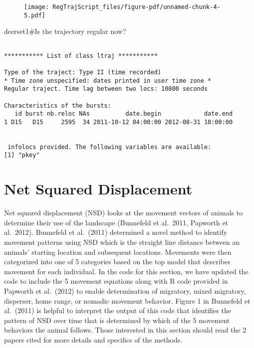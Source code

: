 \documentclass[
  letterpaper,
]{book}
\newenvironment{Shaded}{\begin{snugshade}}{\end{snugshade}}
\newcommand{\CommentTok}[1]{\textcolor[rgb]{0.37,0.37,0.37}{#1}}
\newcommand{\NormalTok}[1]{\textcolor[rgb]{0.00,0.23,0.31}{#1}}
\begin{document}
\begin{figure}[H]

{\centering \texttt{[image: RegTrajScript\_files/figure-pdf/unnamed-chunk-4-5.pdf]}

}

\end{figure}

\begin{Shaded}
\begin{Highlighting}[]
\NormalTok{deerset1}\CommentTok{\#Is the trajectory regular now?}
\end{Highlighting}
\end{Shaded}

\begin{verbatim}

*********** List of class ltraj ***********

Type of the traject: Type II (time recorded)
* Time zone unspecified: dates printed in user time zone *
Regular traject. Time lag between two locs: 10800 seconds

Characteristics of the bursts:
   id burst nb.reloc NAs          date.begin            date.end
1 D15   D15     2595  34 2011-10-12 04:00:00 2012-08-31 10:00:00


 infolocs provided. The following variables are available:
[1] "pkey"
\end{verbatim}

\hypertarget{net-squared-displacement}{%
\chapter{Net Squared Displacement}\label{net-squared-displacement}}

Net squared displacement (NSD) looks at the movement vectors of animals
to determine their use of the landscape (Bunnefeld et al.~2011, Papworth
et al.~2012). Bunnefeld et al.~(2011) determined a novel method to
identify movement patterns using NSD which is the straight line distance
between an animals' starting location and subsequent locations.
Movements were then categorized into one of 5 categories based on the
top model that describes movement for each individual. In the code for
this section, we have updated the code to include the 5 movement
equations along with R code provided in Papworth et al.~(2012) to enable
determination of migratory, mixed migratory, disperser, home range, or
nomadic movement behavior. Figure 1 in Bunnefeld et al.~(2011) is
helpful to interpret the output of this code that identifies the pattern
of NSD over time that is determined by which of the 5 movement behaviors
the animal follows. Those interested in this section should read the 2
papers cited for more details and specifics of the methods.
\end{document}
